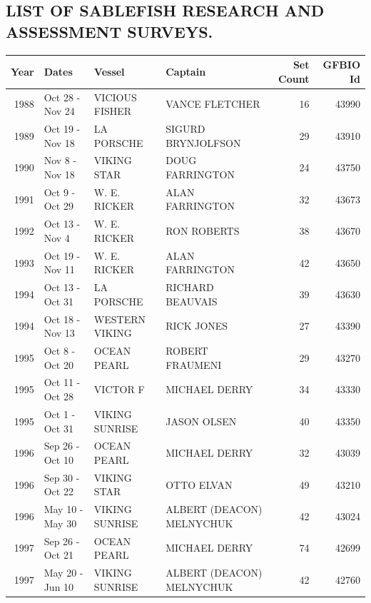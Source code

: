 \documentclass[12pt]{article}\usepackage[]{graphicx}\usepackage[]{color}
\begin{document}
\begin{appendices}

\clearpage

\section{LIST OF SABLEFISH RESEARCH AND ASSESSMENT SURVEYS.}
\label{app:first-appendix}

\begingroup\fontsize{9}{11}\selectfont
\begin{longtable}{rlllrr}
\toprule
\textbf{Year} & \textbf{Dates} & \textbf{Vessel} & \textbf{Captain} & \textbf{Set Count} & \textbf{GFBIO Id}\\
\midrule
1988 & Oct 28  - Nov 24 & VICIOUS FISHER & VANCE FLETCHER & 16 & 43990\\
1989 & Oct 19  - Nov 18 & LA PORSCHE & SIGURD BRYNJOLFSON & 29 & 43910\\
1990 & Nov  8  - Nov 18 & VIKING STAR & DOUG FARRINGTON & 24 & 43750\\
1991 & Oct  9  - Oct 29 & W. E. RICKER & ALAN FARRINGTON & 32 & 43673\\
1992 & Oct 13  - Nov  4 & W. E. RICKER & RON ROBERTS & 38 & 43670\\
1993 & Oct 19  - Nov 11 & W. E. RICKER & ALAN FARRINGTON & 42 & 43650\\
1994 & Oct 13  - Oct 31 & LA PORSCHE & RICHARD BEAUVAIS & 39 & 43630\\
1994 & Oct 18  - Nov 13 & WESTERN VIKING & RICK JONES & 27 & 43390\\
1995 & Oct  8  - Oct 20 & OCEAN PEARL & ROBERT FRAUMENI & 29 & 43270\\
1995 & Oct 11  - Oct 28 & VICTOR F & MICHAEL DERRY & 34 & 43330\\
1995 & Oct  1  - Oct 31 & VIKING SUNRISE & JASON OLSEN & 40 & 43350\\
1996 & Sep 26  - Oct 10 & OCEAN PEARL & MICHAEL DERRY & 32 & 43039\\
1996 & Sep 30  - Oct 22 & VIKING STAR & OTTO ELVAN & 49 & 43210\\
1996 & May 10  - May 30 & VIKING SUNRISE & ALBERT (DEACON) MELNYCHUK & 42 & 43024\\
1997 & Sep 26  - Oct 21 & OCEAN PEARL & MICHAEL DERRY & 74 & 42699\\
1997 & May 20  - Jun 10 & VIKING SUNRISE & ALBERT (DEACON) MELNYCHUK & 42 & 42760\\

\end{longtable}
\end{appendices}
\end{document}
